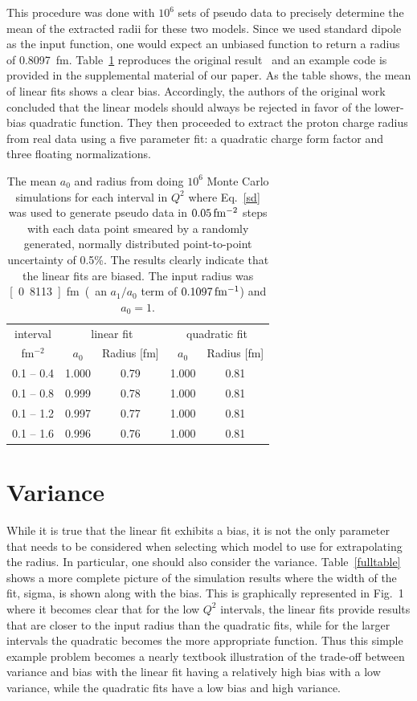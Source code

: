 \documentclass[10pt,aps,prc,twocolumn]{revtex4-1}
\begin{document}
This procedure was done with $10^6$ sets of pseudo data to 
precisely determine the mean of the extracted 
radii for these two models.   Since we used standard dipole as the input function, one would expect an unbiased 
function to return a radius of 0.8097~fm.
Table~\ref{ztable} reproduces the original result~\cite{Borkowski:1975ume} and
an example code is provided in the supplemental material of our paper.  
As the table shows, the mean of linear fits shows a clear bias. 
Accordingly, the authors of the original work concluded that the linear models 
should always be rejected in favor of the lower-bias quadratic function.
They then proceeded to extract the proton charge radius from real data using a five parameter 
fit: a quadratic charge form factor and three floating normalizations.

\begin{table}
\caption{The mean $a_0$ and radius from doing $10^6$ Monte Carlo simulations
for each interval in $Q^2$
where Eq.~\ref{sd} was used to generate pseudo data in $\unit[0.05]{fm^{-2}}$ steps
with each data point smeared by a randomly generated, normally distributed point-to-point 
uncertainty of 0.5\%.
The results clearly indicate that the linear fits are biased.   The input
radius was \unit[0.8113]{fm} (an $a_1/a_0$ term of $\unit[0.1097]{fm^{-1}}$) and $a_0 = 1$.}
\begin{tabular}{c|cc|cc} \hline
interval       & \multicolumn{2}{c|}{linear fit} & \multicolumn{2}{c}{quadratic fit}  \\
fm$^{-2}$      & $a_0$      & Radius [fm]          & $a_0$    & Radius [fm] \\ \hline
 0.1 -- 0.4 & 1.000& 0.79& 1.000& 0.81 \\
 0.1 -- 0.8 & 0.999& 0.78& 1.000& 0.81 \\
 0.1 -- 1.2 & 0.997& 0.77& 1.000& 0.81 \\
 0.1 -- 1.6 & 0.996& 0.76& 1.000& 0.81 \\ \hline
\end{tabular}
\label{ztable}
\end{table}


\section{Variance}

While it is true that the linear fit exhibits a bias, it is not the only parameter that needs
to be considered when selecting which model to use for extrapolating the radius.
In particular, one should also consider the variance.
Table~\ref{fulltable} shows a more complete picture of the simulation results 
where the width of the fit, sigma, is 
shown along with the bias.   This is graphically represented in Fig.~1 where it becomes clear that 
for the low $Q^2$ intervals, the linear fits provide results that are closer to
the input radius than the quadratic fits, while for the larger intervals the quadratic becomes
the more appropriate function.
Thus this simple example problem becomes a nearly textbook illustration of the trade-off between 
variance and bias with the linear fit having a relatively high bias with a low variance, while the 
quadratic fits have a low bias and high variance.
\end{document}
